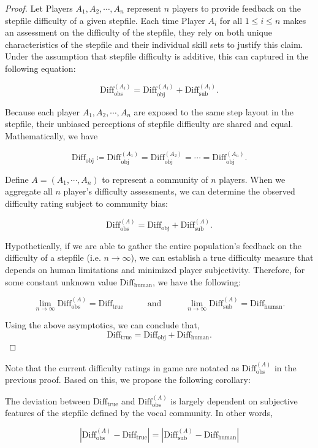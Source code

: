 \begin{proof}
Let Players $A_1, A_2, \cdots, A_n$ represent $n$ players to provide feedback on the stepfile difficulty of a given stepfile. Each time Player $A_i$ for all $1 \leq i \leq n$ makes an assessment on the difficulty of the stepfile, they rely on both unique characteristics of the stepfile and their individual skill sets
to justify this claim. Under the assumption that stepfile difficulty is additive, this can captured in the following equation:

$$\text{Diff}_{\text{obs}}^{(A_i)} = \text{Diff}_{\text{obj}}^{(A_i)} + \text{Diff}_{\text{sub}}^{(A_i)}.$$

Because each player $A_1, A_2, \cdots, A_n$ are exposed to the same step layout in the stepfile, their unbiased perceptions of stepfile difficulty are shared and equal. Mathematically, we have

$$\text{Diff}_{\text{obj}} \coloneq \text{Diff}_{\text{obj}}^{(A_1)} = \text{Diff}_{\text{obj}}^{(A_2)} = \cdots = \text{Diff}_{\text{obj}}^{(A_n)}.$$

Define $A = (A_1, \cdots, A_n)$ to represent a community of $n$ players. When we aggregate all $n$ player's difficulty assessments, we can determine the observed difficulty rating subject to community bias:

$$\text{Diff}_{\text{obs}}^{(A)} = \text{Diff}_{\text{obj}} + \text{Diff}_{\text{sub}}^{(A)}.$$

Hypothetically, if we are able to gather the entire population's feedback on the difficulty of a stepfile (i.e. $n \rightarrow \infty$), we can establish a true difficulty measure that depends on human limitations and minimized player subjectivity. Therefore, for some constant unknown value $\text{Diff}_{\text{human}}$, we have the following:

$$\lim_{n \rightarrow \infty} \text{Diff}_{\text{obs}}^{(A)} = \text{Diff}_{\text{true}}\mspace{50mu} \text{and} \mspace{50mu} \lim_{n \rightarrow \infty} \text{Diff}_{\text{sub}}^{(A)} = \text{Diff}_{\text{human}}.$$

Using the above asymptotics, we can conclude that,
$$\text{Diff}_{\text{true}} = \text{Diff}_{\text{obj}} + \text{Diff}_{\text{human}}.$$
\end{proof}

Note that the current difficulty ratings in game are notated as $\text{Diff}_{\text{obs}}^{(A)}$ in the previous proof. Based on this, we propose the following corollary:

\begin{corollary}
The deviation between $\text{Diff}_{\text{true}}$ and $\text{Diff}_{\text{obs}}^{(A)}$ is largely dependent on subjective features of the stepfile defined by the vocal community. In other words,

$$|\text{Diff}_{\text{obs}}^{(A)} - \text{Diff}_{\text{true}}| = |\text{Diff}_{\text{sub}}^{(A)} - \text{Diff}_{\text{human}}|$$
\end{corollary}

